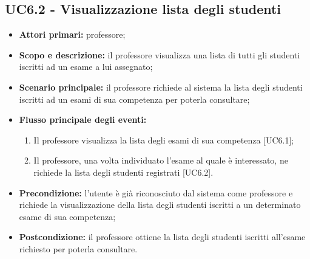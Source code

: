 \documentclass[AnalisiDeiRequisiti.tex]{subfiles}
\begin{document}
\subsection{UC6.2 - Visualizzazione lista degli studenti}
\begin{itemize}
	\item \textbf{Attori primari:} professore;
	\item \textbf{Scopo e descrizione:} il professore visualizza una lista di tutti gli studenti iscritti ad un esame a lui assegnato;
	\item \textbf{Scenario principale:} il professore richiede al sistema la lista degli studenti iscritti ad un esami di sua competenza per poterla consultare;
	\item \textbf{Flusso principale degli eventi:}
	\begin{enumerate}
		\item Il professore visualizza la lista degli esami di sua competenza [UC6.1];
		\item Il professore, una volta individuato l'esame al quale è interessato, ne richiede la lista degli studenti registrati [UC6.2].
	\end{enumerate}
	\item \textbf{Precondizione:} l'utente è già riconosciuto dal sistema come professore e richiede la visualizzazione della lista degli studenti iscritti a un determinato esame di sua competenza;
	\item \textbf{Postcondizione:} il professore ottiene la lista degli studenti iscritti all'esame richiesto per poterla consultare.
\end{itemize}
\end{document}
